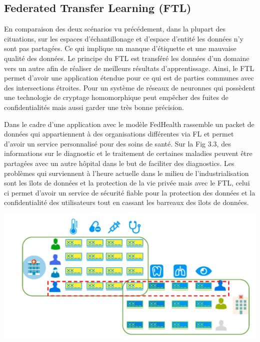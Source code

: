 \documentclass[12pt,a4paper]{report}
\begin{document}
\subsection{Federated Transfer Learning (FTL)}

En comparaison des deux scénarios vu précédement, dans la plupart des cituations, sur les espaces d'échantillonage et d'espace d'entité les données n'y sont pas partagées. Ce qui implique un manque d'étiquette et une mauvaise qualité des données. Le principe du FTL est transféré les données d'un domaine vers un autre afin de réaliser de meilleurs résultats d'apprentissage. Ainsi, le FTL permet d'avoir une application étendue pour ce qui est de parties communes avec des intersections étroites. Pour un système de réseaux de neuronnes qui possèdent une technologie de cryptage homomorphique peut empêcher des fuites de confidentialités mais aussi garder une très bonne précision. 

Dans le cadre d'une application avec le modèle FedHealth rassemble un packet de données qui appartiennent à des organisations différentes via FL et permet d'avoir un service personnalisé pour des soins de santé. Sur la Fig 3.3, des informations sur le diagnostic et le traitement de certaines maladies peuvent être partagées avec un autre hôpital dans le but de faciliter des diagnostics. Les problèmes qui surviennent à l'heure actuelle dans le milieu de l'industrialisation sont les îlots de données et la protection de la vie privée mais avec le FTL, celui ci permet d'avoir un service de sécurité fiable pour la protection des données et la confidentialité des utilisateurs tout en cassant les barreaux des îlots de données.

\begin{center}
	\includegraphics[scale=0.2]{fl_distribute}
	\label{fig1}
\end{center}
\end{document}
